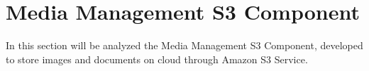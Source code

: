 \section{Media Management S3 Component}
\label{sec:S3_component}

In this section will be analyzed the Media Management S3 Component, developed to store images and documents on cloud through Amazon S3 Service.

